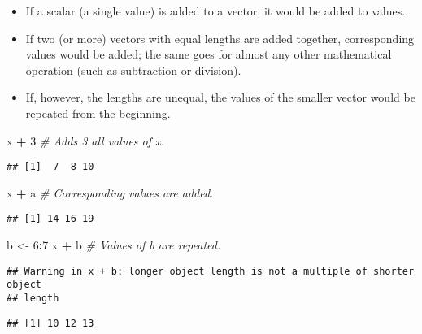 \documentclass[
]{book}
\newenvironment{Shaded}{\begin{snugshade}}{\end{snugshade}}
\newcommand{\CommentTok}[1]{\textcolor[rgb]{0.56,0.35,0.01}{\textit{#1}}}
\newcommand{\DecValTok}[1]{\textcolor[rgb]{0.00,0.00,0.81}{#1}}
\newcommand{\NormalTok}[1]{#1}
\newcommand{\OperatorTok}[1]{\textcolor[rgb]{0.81,0.36,0.00}{\textbf{#1}}}
\newcommand{\StringTok}[1]{\textcolor[rgb]{0.31,0.60,0.02}{#1}}
\begin{document}
\begin{itemize}
\item
  If a scalar (a single value) is added to a vector, it would be added to values.
\item
  If two (or more) vectors with equal lengths are added together, corresponding values would be added; the same goes for almost any other mathematical operation (such as subtraction or division).
\item
  If, however, the lengths are unequal, the values of the smaller vector would be repeated from the beginning.
\end{itemize}

\begin{Shaded}
\begin{Highlighting}[]
\NormalTok{x }\OperatorTok{+}\StringTok{ }\DecValTok{3} \CommentTok{# Adds 3 all values of x.}
\end{Highlighting}
\end{Shaded}

\begin{verbatim}
## [1]  7  8 10
\end{verbatim}

\begin{Shaded}
\begin{Highlighting}[]
\NormalTok{x }\OperatorTok{+}\StringTok{ }\NormalTok{a }\CommentTok{# Corresponding values are added.}
\end{Highlighting}
\end{Shaded}

\begin{verbatim}
## [1] 14 16 19
\end{verbatim}

\begin{Shaded}
\begin{Highlighting}[]
\NormalTok{b <-}\StringTok{ }\DecValTok{6}\OperatorTok{:}\DecValTok{7}
\NormalTok{x }\OperatorTok{+}\StringTok{ }\NormalTok{b }\CommentTok{# Values of b are repeated. }
\end{Highlighting}
\end{Shaded}

\begin{verbatim}
## Warning in x + b: longer object length is not a multiple of shorter object
## length
\end{verbatim}

\begin{verbatim}
## [1] 10 12 13
\end{verbatim}
\end{document}
